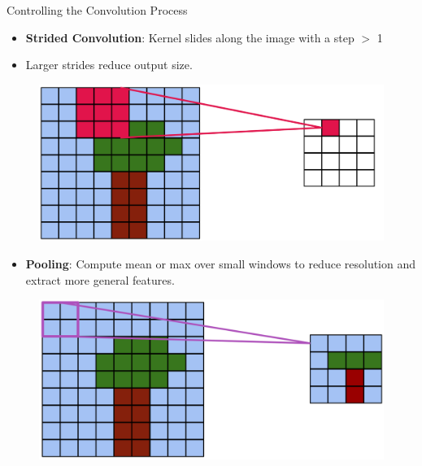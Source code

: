\documentclass[10pt]{beamer}
\theoremstyle{remark}
\theoremstyle{definition}
\begin{document}
\begin{frame}[allowframebreaks]{Controlling the Convolution Process}
\framebreak

\begin{itemize}
    \item \textbf{Strided Convolution}: Kernel slides along the image with a step $>$ 1
    \item Larger strides reduce output size.
\end{itemize}


\begin{figure}
\centering
\includegraphics[width=1.0\textwidth,height=0.8\textheight,keepaspectratio]{./images/stride_2.png}
\end{figure}
    
\framebreak

\begin{itemize}
    \item \textbf{Pooling}: Compute mean or max over small windows to reduce resolution and extract more general features.
\end{itemize}


\begin{figure}
\centering
\includegraphics[width=1.0\textwidth,height=0.8\textheight,keepaspectratio]{./images/pool_1.png}
\end{figure}

\framebreak


\end{frame}
\end{document}
